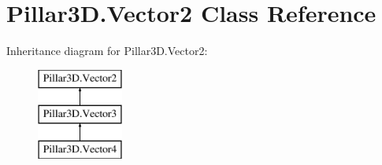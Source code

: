 \hypertarget{class_pillar3_d_1_1_vector2}{}\section{Pillar3\+D.\+Vector2 Class Reference}
\label{class_pillar3_d_1_1_vector2}
Inheritance diagram for Pillar3\+D.\+Vector2\+:\begin{figure}[H]
\begin{center}
\leavevmode
\includegraphics[height=3.000000cm]{class_pillar3_d_1_1_vector2}
\end{center}
\end{figure}
